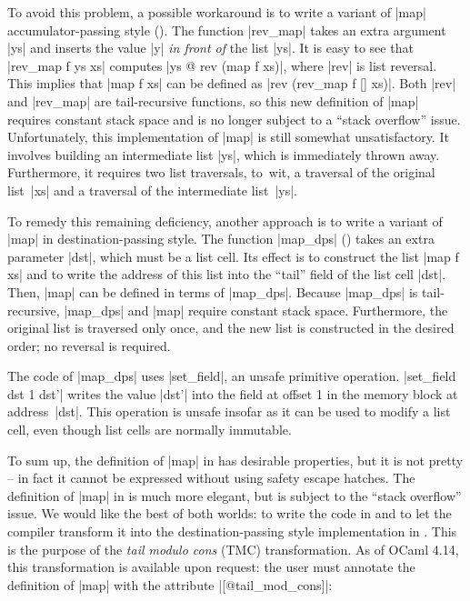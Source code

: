 To avoid this problem, a possible workaround is to write a variant of \ocaml|map|
accumulator-passing style (). The function \ocaml|rev_map|
takes an extra argument \ocaml|ys| and inserts the value \ocaml|y| \emph{in front
  of} the list \ocaml|ys|.
%
It is easy to see that \ocaml|rev_map f ys xs| computes
%
\ocaml|ys @ rev (map f xs)|,
%
where \ocaml|rev| is list reversal.
%
This implies that
%
\ocaml|map f xs|
%
can be defined as \ocaml|rev (rev_map f [] xs)|.
%
Both \ocaml|rev| and \ocaml|rev_map| are tail-recursive functions, so this new
definition of \ocaml|map| requires constant stack space and is no longer subject
to a ``stack overflow'' issue.
%
Unfortunately, this implementation of \ocaml|map| is still somewhat
unsatisfactory. It involves building an intermediate list \ocaml|ys|, which is
immediately thrown away. Furthermore, it requires two list traversals, to~wit,
a traversal of the original list~\ocaml|xs| and a traversal of the intermediate
list~\ocaml|ys|.

To remedy this remaining deficiency, another approach is to write a variant of
\ocaml|map| in destination-passing style.
\nocite{shaikha-17}
%
The function \ocaml|map_dps| () takes an extra parameter
\ocaml|dst|, which must be a list cell. Its effect is to construct the list
\ocaml|map f xs| and to write the address of this list into the ``tail''
field of the list cell \ocaml|dst|.
%
Then, \ocaml|map| can be defined in terms of \ocaml|map_dps|.
%
Because \ocaml|map_dps| is tail-recursive, \ocaml|map_dps| and \ocaml|map| require
constant stack space. Furthermore, the original list is traversed only once,
and the new list is constructed in the desired order; no reversal is required.

The code of \ocaml|map_dps| uses \ocaml|set_field|, an unsafe primitive
operation. \ocaml|set_field dst 1 dst'| writes the value \ocaml|dst'| into the field
at offset 1 in the memory block at address~\ocaml|dst|. This operation is unsafe
insofar as it can be used to modify a list cell, even though list cells are
normally immutable.

To sum up, the definition of \ocaml|map| in  has desirable
properties, but it is not pretty -- in fact it cannot be expressed without using safety escape hatches. The definition of \ocaml|map| in 
is much more elegant, but is subject to the ``stack overflow'' issue. We would
like the best of both worlds: to write the code in  and to let
the compiler transform it into the destination-passing style implementation in
. This is the purpose of the \emph{tail modulo cons} (TMC)
transformation. As of OCaml 4.14, this transformation is available upon
request: the user must annotate the definition of \ocaml|map| with the attribute
\ocaml|[@tail_mod_cons]|:

